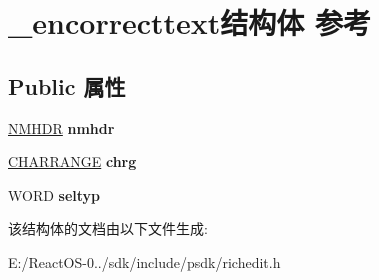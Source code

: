 \hypertarget{struct__encorrecttext}{}\section{\+\_\+encorrecttext结构体 参考}
\label{struct__encorrecttext}
\subsection*{Public 属性}
\begin{DoxyCompactItemize}
\item 
\mbox{\label{struct__encorrecttext_a6fb2628f459e828cba0d65815ab568fe}} 
\hyperlink{structtag_n_m_h_d_r}{N\+M\+H\+DR} {\bfseries nmhdr}
\item 
\mbox{\label{struct__encorrecttext_a9c48308e59812f389ac3702380761b7a}} 
\hyperlink{struct__charrange}{C\+H\+A\+R\+R\+A\+N\+GE} {\bfseries chrg}
\item 
\mbox{\label{struct__encorrecttext_ab09e66b3457b4881178acc4cb66b5c35}} 
W\+O\+RD {\bfseries seltyp}
\end{DoxyCompactItemize}


该结构体的文档由以下文件生成\+:\begin{DoxyCompactItemize}
\item 
E\+:/\+React\+O\+S-\/0../sdk/include/psdk/richedit.\+h\end{DoxyCompactItemize}
